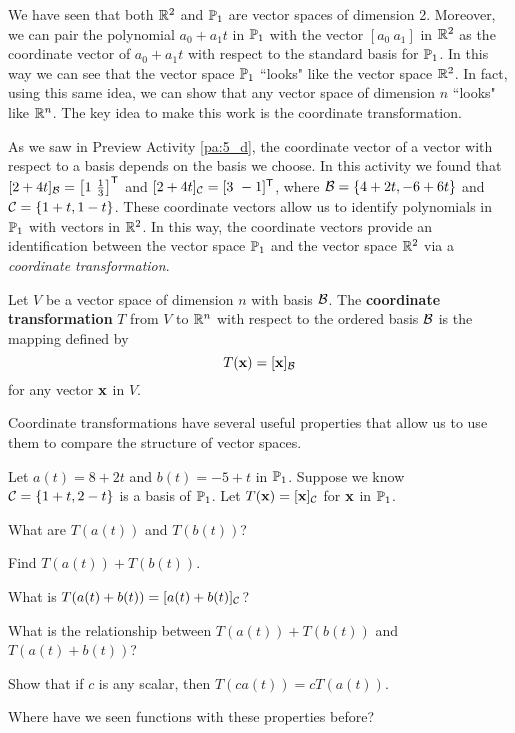 \label{sec:coord_trans}

We have seen that both $\mathbb{R}^2$ and $\mathbb{P}_1$ are vector spaces of dimension 2. Moreover, we can pair the polynomial $a_0+a_1t$ in $\mathbb{P}_1$ with the vector $[a_0 \ a_1]$ in $\mathbb{R}^2$ as the coordinate vector of $a_0+a_1t$ with respect to the standard basis for $\mathbb{P}_1$. In this way we can see that the vector space $\mathbb{P}_1$ ``looks" like the vector space $\mathbb{R}^2$. In fact, using this same idea, we can show that any vector space of dimension $n$ ``looks" like $\mathbb{R}^n$. The key idea to make this work is the coordinate transformation. 

As we saw in Preview Activity \ref{pa:5_d}, the coordinate vector of a vector with respect to a basis depends on the basis we choose. In this activity we found that $[2+4t]_{\mathcal{B}} = \left[ 1 \ \frac{1}{3} \right]^{\mathsf{T}}$ and $[2+4t]_{\mathcal{C}} = [ 3 \ -1]^{\mathsf{T}}$, where $\mathcal{B} = \{4+2t, -6+6t\}$ and $\mathcal{C} = \{1+t, 1-t\}$. These coordinate vectors allow us to identify polynomials in $\mathbb{P}_1$ with vectors in $\mathbb{R}^2$. In this way, the coordinate vectors provide an identification between the vector space $\mathbb{P}_1$ and the vector space  $\mathbb{R}^2$ via a \emph{coordinate transformation}. 

\begin{definition} Let $V$ be a vector space of dimension $n$ with basis $\mathcal{B}$. The \textbf{coordinate transformation} $T$ from $V$ to $\mathbb{R}^n$ with respect to the ordered basis $\mathcal{B}$ is the mapping defined by 
\[T(\mathbf{x}) = [\mathbf{x}]_{\mathcal{B}}\]
for any vector $\mathbf{x}$ in $V$. 
\end{definition}

Coordinate transformations have several useful properties that allow us to use them to compare the structure of vector spaces. 

\begin{activity} \label{act:5_d_2} Let $a(t) = 8+2t$ and $b(t) = -5+t$ in $\mathbb{P}_1$. Suppose we know $\mathcal{C} =  \{1 + t, 2 - t\}$ is a basis of $\mathbb{P}_1$. Let $T(\mathbf{x})=[\mathbf{x}]_{\mathcal{C}}$ for $\mathbf{x}$ in $\mathbb{P}_1$.  
\ba
\item What are $T(a(t))$ and $T(b(t))$?

	\item Find $T(a(t)) + T(b(t))$.

	\item What is $T(a(t)+b(t))= [a(t)+b(t)]_{\mathcal{C}}$?

	\item What is the relationship between $T(a(t)) + T(b(t))$ and $T(a(t)+b(t))$?


	\item Show that if $c$ is any scalar, then $T(ca(t)) = cT(a(t))$.

	\item Where have we seen functions with these properties before? 
	
\ea

\end{activity}

